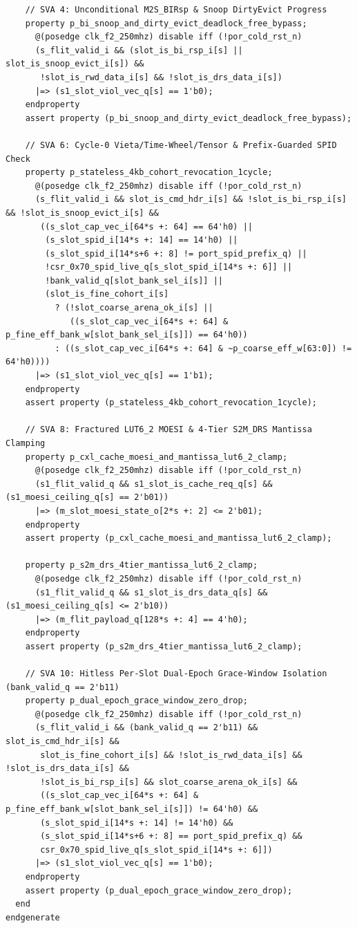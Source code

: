\documentclass[10pt,twocolumn]{article}
\theoremstyle{spectralthm}
\begin{document}
\begin{lstlisting}
    // SVA 4: Unconditional M2S_BIRsp & Snoop DirtyEvict Progress
    property p_bi_snoop_and_dirty_evict_deadlock_free_bypass;
      @(posedge clk_f2_250mhz) disable iff (!por_cold_rst_n)
      (s_flit_valid_i && (slot_is_bi_rsp_i[s] || slot_is_snoop_evict_i[s]) &&
       !slot_is_rwd_data_i[s] && !slot_is_drs_data_i[s])
      |=> (s1_slot_viol_vec_q[s] == 1'b0);
    endproperty
    assert property (p_bi_snoop_and_dirty_evict_deadlock_free_bypass);

    // SVA 6: Cycle-0 Vieta/Time-Wheel/Tensor & Prefix-Guarded SPID Check
    property p_stateless_4kb_cohort_revocation_1cycle;
      @(posedge clk_f2_250mhz) disable iff (!por_cold_rst_n)
      (s_flit_valid_i && slot_is_cmd_hdr_i[s] && !slot_is_bi_rsp_i[s] && !slot_is_snoop_evict_i[s] &&
       ((s_slot_cap_vec_i[64*s +: 64] == 64'h0) ||
        (s_slot_spid_i[14*s +: 14] == 14'h0) ||
        (s_slot_spid_i[14*s+6 +: 8] != port_spid_prefix_q) ||
        !csr_0x70_spid_live_q[s_slot_spid_i[14*s +: 6]] ||
        !bank_valid_q[slot_bank_sel_i[s]] ||
        (slot_is_fine_cohort_i[s]
          ? (!slot_coarse_arena_ok_i[s] ||
             ((s_slot_cap_vec_i[64*s +: 64] & p_fine_eff_bank_w[slot_bank_sel_i[s]]) == 64'h0))
          : ((s_slot_cap_vec_i[64*s +: 64] & ~p_coarse_eff_w[63:0]) != 64'h0))))
      |=> (s1_slot_viol_vec_q[s] == 1'b1);
    endproperty
    assert property (p_stateless_4kb_cohort_revocation_1cycle);

    // SVA 8: Fractured LUT6_2 MOESI & 4-Tier S2M_DRS Mantissa Clamping
    property p_cxl_cache_moesi_and_mantissa_lut6_2_clamp;
      @(posedge clk_f2_250mhz) disable iff (!por_cold_rst_n)
      (s1_flit_valid_q && s1_slot_is_cache_req_q[s] && (s1_moesi_ceiling_q[s] == 2'b01))
      |=> (m_slot_moesi_state_o[2*s +: 2] <= 2'b01);
    endproperty
    assert property (p_cxl_cache_moesi_and_mantissa_lut6_2_clamp);

    property p_s2m_drs_4tier_mantissa_lut6_2_clamp;
      @(posedge clk_f2_250mhz) disable iff (!por_cold_rst_n)
      (s1_flit_valid_q && s1_slot_is_drs_data_q[s] && (s1_moesi_ceiling_q[s] <= 2'b10))
      |=> (m_flit_payload_q[128*s +: 4] == 4'h0);
    endproperty
    assert property (p_s2m_drs_4tier_mantissa_lut6_2_clamp);

    // SVA 10: Hitless Per-Slot Dual-Epoch Grace-Window Isolation (bank_valid_q == 2'b11)
    property p_dual_epoch_grace_window_zero_drop;
      @(posedge clk_f2_250mhz) disable iff (!por_cold_rst_n)
      (s_flit_valid_i && (bank_valid_q == 2'b11) && slot_is_cmd_hdr_i[s] &&
       slot_is_fine_cohort_i[s] && !slot_is_rwd_data_i[s] && !slot_is_drs_data_i[s] &&
       !slot_is_bi_rsp_i[s] && slot_coarse_arena_ok_i[s] &&
       ((s_slot_cap_vec_i[64*s +: 64] & p_fine_eff_bank_w[slot_bank_sel_i[s]]) != 64'h0) &&
       (s_slot_spid_i[14*s +: 14] != 14'h0) &&
       (s_slot_spid_i[14*s+6 +: 8] == port_spid_prefix_q) &&
       csr_0x70_spid_live_q[s_slot_spid_i[14*s +: 6]])
      |=> (s1_slot_viol_vec_q[s] == 1'b0);
    endproperty
    assert property (p_dual_epoch_grace_window_zero_drop);
  end
endgenerate


\end{lstlisting}
\end{document}
